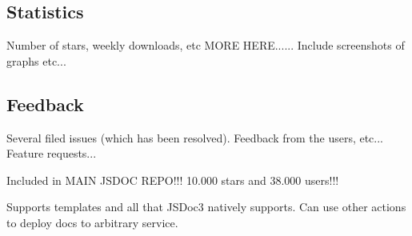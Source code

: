 \subsection{Statistics}
Number of stars, weekly downloads, etc
MORE HERE...... Include screenshots of graphs etc...

\subsection{Feedback}
Several filed issues (which has been resolved). Feedback from the users, etc... Feature requests...

Included in MAIN JSDOC REPO!!! 10.000 stars and 38.000 users!!!

Supports templates and all that JSDoc3 natively supports.
Can use other actions to deploy docs to arbitrary service.